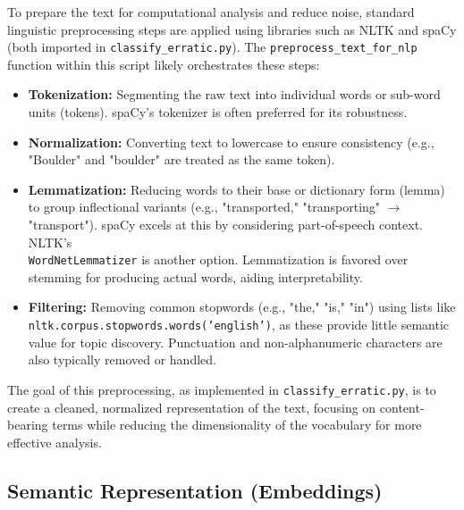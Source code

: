 \documentclass[
11pt, %
english, %
singlespacing, %
headsepline, %
]{MastersDoctoralThesis} %
\begin{document}
To prepare the text for computational analysis and reduce noise, standard linguistic preprocessing steps are applied using libraries such as NLTK and spaCy (both imported in \texttt{classify\_erratic.py}). The \texttt{preprocess\_text\_for\_nlp} function within this script likely orchestrates these steps:
\begin{itemize}
    \item \textbf{Tokenization:} Segmenting the raw text into individual words or sub-word units (tokens). spaCy's tokenizer is often preferred for its robustness.
    \item \textbf{Normalization:} Converting text to lowercase to ensure consistency (e.g., "Boulder" and "boulder" are treated as the same token).
    \item \textbf{Lemmatization:} Reducing words to their base or dictionary form (lemma) to group inflectional variants (e.g., "transported," "transporting" $\rightarrow$ "transport"). spaCy excels at this by considering part-of-speech context. 
    NLTK's \\ \texttt{WordNetLemmatizer} is another option. Lemmatization is favored over stemming for producing actual words, aiding interpretability.
    \item \textbf{Filtering:} Removing common stopwords (e.g., "the," "is," "in") using lists like \texttt{nltk.corpus.stopwords.words('english')}, as these provide little semantic value for topic discovery. Punctuation and non-alphanumeric characters are also typically removed or handled.
\end{itemize}
The goal of this preprocessing, as implemented in \texttt{classify\_erratic.py}, is to create a cleaned, normalized representation of the text, focusing on content-bearing terms while reducing the dimensionality of the vocabulary for more effective analysis.

\subsection{Semantic Representation (Embeddings)}
\label{subsec:embeddings}
\end{document}
